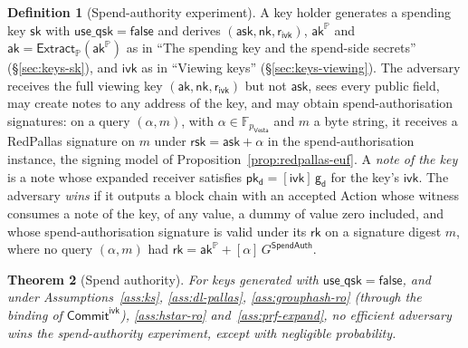 \documentclass[11pt,a4paper]{article}
\newtheorem{theorem}{Theorem}[section]
\theoremstyle{definition}
\newtheorem{definition}[theorem]{Definition}
\newcommand{\F}{\mathbb{F}}
\newcommand{\PP}{\mathbb{P}}
\newcommand{\rk}{\mathsf{rk}}
\newcommand{\Vesta}{\ensuremath{\mathsf{Vesta}}}
\newcommand{\CommitIvk}{\ensuremath{\mathsf{Commit}^{\mathsf{ivk}}}}
\newcommand{\Extract}{\ensuremath{\mathsf{Extract}}}
\newcommand{\ask}{\ensuremath{\mathsf{ask}}}
\newcommand{\aksym}{\ensuremath{\mathsf{ak}}}
\newcommand{\nksym}{\ensuremath{\mathsf{nk}}}
\newcommand{\ivk}{\ensuremath{\mathsf{ivk}}}
\newcommand{\pkd}{\ensuremath{\mathsf{pk_d}}}
\newcommand{\gd}{\ensuremath{\mathsf{g_d}}}
\newcommand{\rivk}{\ensuremath{\mathsf{r_{ivk}}}}
\newcommand{\rsk}{\ensuremath{\mathsf{rsk}}}
\begin{document}
\begin{definition}[Spend-authority experiment]
A key holder generates a spending key $\mathsf{sk}$ with
$\mathsf{use\_qsk} = \mathsf{false}$ and derives $(\ask, \nksym, \rivk)$,
$\aksym^{\PP}$ and $\aksym = \Extract_{\PP}(\aksym^{\PP})$ as in ``The
spending key and the spend-side secrets'' (\S\ref{sec:keys-sk}), and $\ivk$
as in ``Viewing keys'' (\S\ref{sec:keys-viewing}). The adversary receives
the full viewing key $(\aksym, \nksym, \rivk)$ but not $\ask$, sees every
public field, may create notes to any address of the key, and may obtain
spend-authorisation signatures: on a query $(\alpha, m)$, with
$\alpha \in \F_{p_{\Vesta}}$ and $m$ a byte string, it receives a RedPallas
signature on $m$ under $\rsk = \ask + \alpha$ in the spend-authorisation
instance, the signing model of Proposition~\ref{prop:redpallas-euf}. A
\emph{note of the key} is a note whose expanded receiver satisfies
$\pkd = [\ivk]\,\gd$ for the key's $\ivk$. The adversary \emph{wins} if it
outputs a block chain with an accepted Action whose witness consumes a note
of the key, of any value, a dummy of value zero included, and whose
spend-authorisation signature is valid under its $\rk$ on a signature
digest $m$, where no query $(\alpha, m)$ had
$\rk = \aksym^{\PP} + [\alpha]\,G^{\mathsf{SpendAuth}}$.
\end{definition}

\begin{theorem}[Spend authority]\label{thm:spend-authority}
For keys generated with $\mathsf{use\_qsk} = \mathsf{false}$, and under
Assumptions~\ref{ass:ks}, \ref{ass:dl-pallas}, \ref{ass:grouphash-ro}
(through the binding of $\CommitIvk$), \ref{ass:hstar-ro}
and~\ref{ass:prf-expand}, no efficient adversary wins the spend-authority
experiment, except with negligible probability.
\end{theorem}
\end{document}
